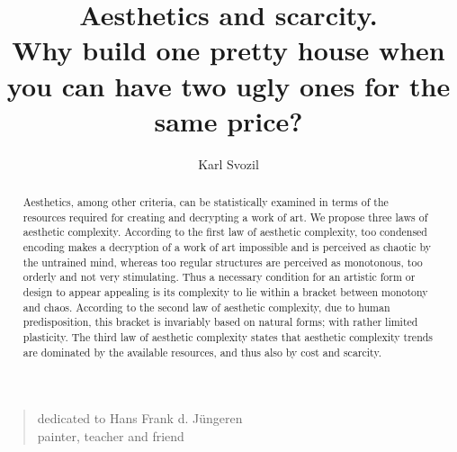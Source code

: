 \documentclass[%
 reprint,
 showpacs,
 showkeys,
 amsmath,
 amssymb,
 aps,
 pra,
 longbibliography,
 floatfix,
 ]{revtex4-1}
\begin{document}


\title{Aesthetics and scarcity.\\ Why build one pretty house when you can have two ugly ones for the same price?
}

\author{Karl Svozil}




\begin{abstract}
Aesthetics, among other criteria, can be statistically examined in terms of the resources required for creating and decrypting a work of art.
We propose three laws of aesthetic complexity.
According to the first law of aesthetic complexity, too condensed encoding makes a decryption of a work of art impossible and is perceived as chaotic by the untrained mind, whereas too regular structures are perceived as monotonous, too orderly and not very stimulating.
Thus a necessary condition for an artistic form or design to appear appealing is its complexity to lie within a bracket between monotony and chaos.
According to the second law of aesthetic complexity, due to human predisposition, this bracket is invariably based on natural forms; with rather limited plasticity.
The third law of aesthetic complexity states that aesthetic complexity trends are dominated by the available resources, and thus also by cost and scarcity.
\end{abstract}

\maketitle

\begin{quote}
\begin{flushright}
{\footnotesize
dedicated to Hans Frank d. J\"ungeren\\
painter, teacher and friend}
\end{flushright}
\end{quote}

\tableofcontents
\end{document}

